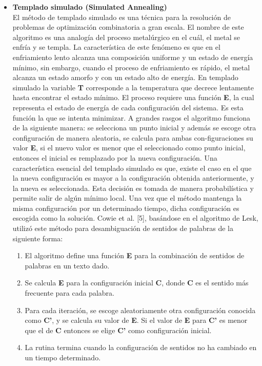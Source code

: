 \begin{itemize}
    \item \textbf{Templado simulado (Simulated Annealing)} \\
    El método de templado simulado es una técnica para la resolución de problemas de optimización combinatoria a gran escala. El nombre de este algoritmo es una analogía del proceso metalúrgico en el cuál, el metal se enfría y se templa. La característica de este fenómeno es que en el enfriamiento lento alcanza una composición uniforme y un estado de energía mínimo, sin embargo, cuando el proceso de enfriamiento es rápido, el metal alcanza un estado amorfo y con un estado alto de energía. En templado simulado la variable \textbf{T} corresponde a la temperatura que decrece lentamente hasta encontrar el estado mínimo. 
    El proceso requiere una función \textbf{E}, la cual representa el estado de energía de cada configuración del sistema. Es esta función la que se intenta minimizar. A grandes rasgos el algoritmo funciona de la siguiente manera: se selecciona un punto inicial y además se escoge otra configuración de manera aleatoria, se calcula para ambas con-figuraciones su valor \textbf{E}, si el nuevo valor es menor que el seleccionado como punto inicial, entonces el inicial es remplazado por la nueva configuración. Una característica esencial del templado simulado es que, existe el caso en el que la nueva configuración es mayor a la configuración obtenida anteriormente, y la nueva es seleccionada. Esta decisión es tomada de manera probabilística y permite salir de algún mínimo local. Una vez que el método mantenga la misma configuración por un determinado tiempo, dicha configuración es escogida como la solución. 
    Cowie et al. [5], basándose en el algoritmo de Lesk, utilizó este método para desambiguación de sentidos de palabras de la siguiente forma: 
    \begin{enumerate}
      \item El algoritmo define una función \textbf{E} para la combinación de sentidos de palabras en un texto dado. 
      \item Se calcula \textbf{E} para la configuración inicial \textbf{C}, donde \textbf{C} es el sentido más frecuente para cada palabra.
      \item Para cada iteración, se escoge aleatoriamente otra configuración conocida como \textbf{C’}, y se calcula su valor de \textbf{E}. Si el valor de \textbf{E} para \textbf{C’} es menor que el de \textbf{C} entonces se elige \textbf{C’} como configuración inicial.
      \item  La rutina termina cuando la configuración de sentidos no ha cambiado en un tiempo determinado.
    \end{enumerate}
  

\end{itemize}

